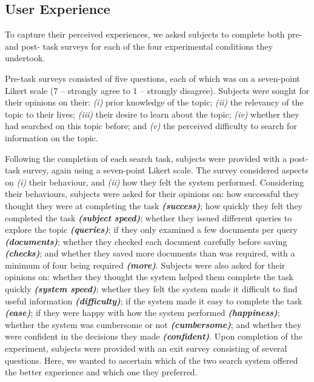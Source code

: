 \subsection{User Experience}\label{sec:method:experience}
To capture their perceived experiences, we asked subjects to complete both pre- and post- task surveys for each of the four experimental conditions they undertook.

Pre-task surveys consisted of five questions, each of which was on a seven-point Likert scale ($7$ -- strongly agree to $1$ -- strongly disagree). Subjects were sought for their opinions on their: \emph{(i)} prior knowledge of the topic; \emph{(ii)} the relevancy of the topic to their lives; \emph{(iii)} their desire to learn about the topic; \emph{(iv)} whether they had searched on this topic before; and \emph{(v)} the perceived difficulty to search for information on the topic.

Following the completion of each search task, subjects were provided with a post-task survey, again using a seven-point Likert scale. The survey considered aspects on \emph{(i)} their behaviour, and \emph{(ii)} how they felt the system performed. Considering their behaviours, subjects were asked for their opinions on: how successful they thought they were at completing the task \emph{\textbf{(success)}}; how quickly they felt they completed the task \emph{\textbf{(subject speed)}}; whether they issued different queries to explore the topic \emph{\textbf{(queries)}}; if they only examined a few documents per query \emph{\textbf{(documents)}}; whether they checked each document carefully before saving \emph{\textbf{(checks)}}; and whether they saved more documents than was required, with a minimum of four being required \emph{\textbf{(more)}}. Subjects were also asked for their opinions on: whether they thought the system helped them complete the task quickly \emph{\textbf{(system speed)}}; whether they felt the system made it difficult to find useful information \emph{\textbf{(difficulty)}}; if the system made it easy to complete the task \emph{\textbf{(ease)}}; if they were happy with how the system performed \emph{\textbf{(happiness)}}; whether the system was cumbersome or not \emph{\textbf{(cumbersome)}}; and whether they were confident in the decisions they made \emph{\textbf{(confident)}}. Upon completion of the experiment, subjects were provided with an exit survey consisting of several questions. Here, we wanted to ascertain which of the two search system offered the better experience and which one they preferred. 

